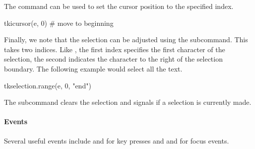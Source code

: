 The  command can be used to set the
cursor position to the specified index.
\begin{Schunk}
\begin{Sinput}
 tkicursor(e, 0)                         # move to beginning
\end{Sinput}
\end{Schunk}

Finally, we note that the selection can be adjusted using the
 subcommand. This takes two
indices. Like , the first index specifies the first character of
the selection, the second indicates the character to the right of the
selection boundary. The following example would select all the text.
\begin{Schunk}
\begin{Sinput}
 tkselection.range(e, 0, "end")
\end{Sinput}
\end{Schunk}
The  subcommand clears the selection and  signals if a selection is currently made.

\paragraph{Events}
Several useful events include  and
 for key presses and 
and  for focus events.



